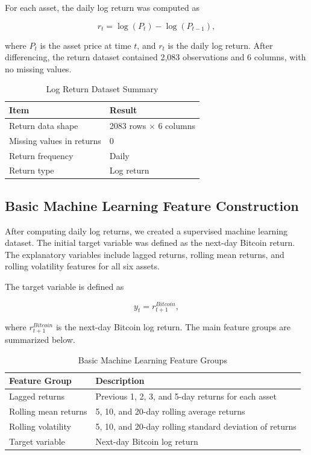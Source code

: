 \documentclass[12pt]{article}
\begin{document}
For each asset, the daily log return was computed as

\begin{equation}
r_t = \log(P_t) - \log(P_{t-1}),
\end{equation}

where $P_t$ is the asset price at time $t$, and $r_t$ is the daily log return. After differencing, the return dataset contained 2,083 observations and 6 columns, with no missing values.

\begin{table}[H]
\centering
\caption{Log Return Dataset Summary}
\begin{tabular}{ll}
\toprule
\textbf{Item} & \textbf{Result} \\
\midrule
Return data shape & 2083 rows $\times$ 6 columns \\
Missing values in returns & 0 \\
Return frequency & Daily \\
Return type & Log return \\
\bottomrule
\end{tabular}
\end{table}

\subsection{Basic Machine Learning Feature Construction}

After computing daily log returns, we created a supervised machine learning dataset. The initial target variable was defined as the next-day Bitcoin return. The explanatory variables include lagged returns, rolling mean returns, and rolling volatility features for all six assets.

The target variable is defined as

\begin{equation}
y_t = r^{Bitcoin}_{t+1},
\end{equation}

where $r^{Bitcoin}_{t+1}$ is the next-day Bitcoin log return. The main feature groups are summarized below.

\begin{table}[H]
\centering
\caption{Basic Machine Learning Feature Groups}
\begin{tabular}{ll}
\toprule
\textbf{Feature Group} & \textbf{Description} \\
\midrule
Lagged returns & Previous 1, 2, 3, and 5-day returns for each asset \\
Rolling mean returns & 5, 10, and 20-day rolling average returns \\
Rolling volatility & 5, 10, and 20-day rolling standard deviation of returns \\
Target variable & Next-day Bitcoin log return \\
\bottomrule
\end{tabular}
\end{table}
\end{document}
